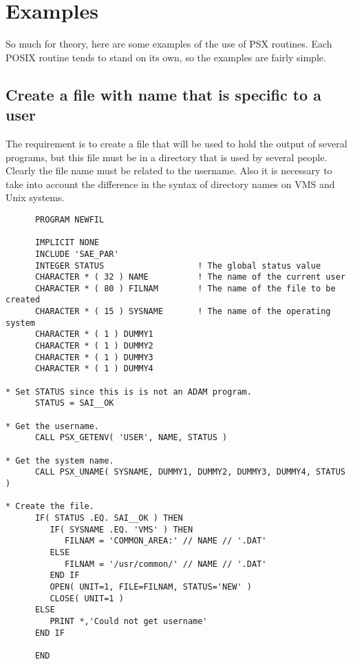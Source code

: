 \appendix
\markright{\stardocname}  %

\newpage
\section{Examples}

So much for theory, here are some examples of the use of PSX routines. Each
POSIX routine tends to stand on its own, so the examples are fairly simple.

\subsection{Create a file with name that is specific to a user}

The requirement is to create a file that will be used to hold the output of
several programs, but this file must be in a directory that is used by several
people. Clearly the file name must be related to the username. Also it is
necessary to take into account the difference in the syntax of directory names
on VMS and Unix systems.

\begin{small}
\begin{verbatim}
      PROGRAM NEWFIL

      IMPLICIT NONE
      INCLUDE 'SAE_PAR'
      INTEGER STATUS                   ! The global status value
      CHARACTER * ( 32 ) NAME          ! The name of the current user
      CHARACTER * ( 80 ) FILNAM        ! The name of the file to be created
      CHARACTER * ( 15 ) SYSNAME       ! The name of the operating system
      CHARACTER * ( 1 ) DUMMY1
      CHARACTER * ( 1 ) DUMMY2
      CHARACTER * ( 1 ) DUMMY3
      CHARACTER * ( 1 ) DUMMY4

* Set STATUS since this is is not an ADAM program.
      STATUS = SAI__OK

* Get the username.
      CALL PSX_GETENV( 'USER', NAME, STATUS )

* Get the system name.
      CALL PSX_UNAME( SYSNAME, DUMMY1, DUMMY2, DUMMY3, DUMMY4, STATUS )

* Create the file.
      IF( STATUS .EQ. SAI__OK ) THEN
         IF( SYSNAME .EQ. 'VMS' ) THEN
            FILNAM = 'COMMON_AREA:' // NAME // '.DAT'
         ELSE
            FILNAM = '/usr/common/' // NAME // '.DAT'
         END IF
         OPEN( UNIT=1, FILE=FILNAM, STATUS='NEW' )
         CLOSE( UNIT=1 )
      ELSE
         PRINT *,'Could not get username'
      END IF

      END
\end{verbatim}
\end{small}      
      

